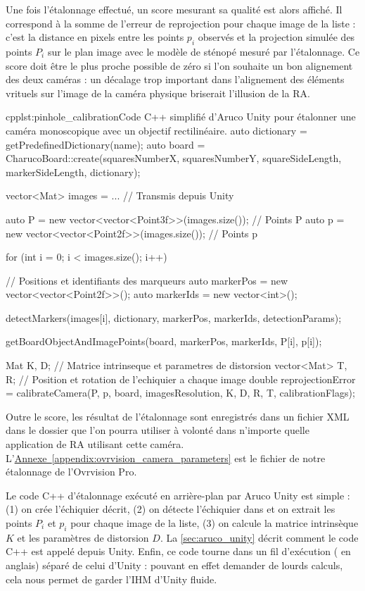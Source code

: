 Une fois l'étalonnage effectué, un score mesurant sa qualité est alors affiché. Il correspond à la somme de l'erreur de reprojection pour chaque image de la liste : c'est la distance en pixels entre les points $p_i$ observés et la projection simulée des points $P_i$ sur le plan image avec le modèle de sténopé mesuré par l'étalonnage. Ce score doit être le plus proche possible de zéro si l'on souhaite un bon alignement des deux caméras : un décalage trop important dans l'alignement des éléments vrituels sur l'image de la caméra physique briserait l'illusion de la RA.

\begin{listingETS}{cpp}{lst:pinhole_calibration}{Code C++ simplifié d'Aruco Unity pour étalonner une caméra monoscopique avec un objectif rectilinéaire.}
  auto dictionary = getPredefinedDictionary(name);
  auto board = CharucoBoard::create(squaresNumberX, squaresNumberY, squareSideLength, markerSideLength, dictionary);

  vector<Mat> images = ... // Transmis depuis Unity

  auto P = new vector<vector<Point3f>>(images.size()); // Points P
  auto p = new vector<vector<Point2f>>(images.size()); // Points p

  for (int i = 0; i < images.size(); i++) {
    // Positions et identifiants des marqueurs
    auto markerPos = new vector<vector<Point2f>>();
    auto markerIds = new vector<int>();

    detectMarkers(images[i], dictionary, markerPos, markerIds, detectionParams);

    getBoardObjectAndImagePoints(board, markerPos, markerIds, P[i], p[i]);
  }

  Mat K, D; // Matrice intrinseque et parametres de distorsion
  vector<Mat> T, R; // Position et rotation de l'echiquier a chaque image
  double reprojectionError = calibrateCamera(P, p, board, imagesResolution, K, D, R, T, calibrationFlags);
\end{listingETS}

Outre le score, les résultat de l'étalonnage sont enregistrés dans un fichier XML dans le dossier  que l'on pourra utiliser à volonté dans n'importe quelle application de RA utilisant cette caméra. L'\hyperref[appendix:ovrvision_camera_parameters]{Annexe~\ref{appendix:ovrvision_camera_parameters}} est le fichier de notre étalonnage de l'Ovrvision Pro.

Le code C++ d'étalonnage exécuté en arrière-plan par Aruco Unity  est simple : (1) on crée l'échiquier décrit, (2) on détecte l'échiquier dans et on extrait les points $P_i$ et $p_i$ pour chaque image de la liste, (3) on calcule la matrice intrinsèque $K$ et les paramètres de distorsion $D$. La \autoref{sec:aruco_unity} décrit comment le code C++ est appelé depuis Unity. Enfin, ce code tourne dans un fil d'exécution ( en anglais) séparé de celui d'Unity : pouvant en effet demander de lourds calculs, cela nous permet de garder l'IHM d'Unity fluide.



